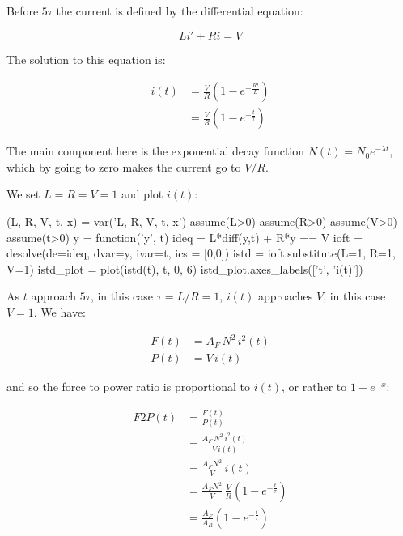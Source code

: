 \documentclass[]{../common/elementary-physics}
\begin{document}
Before $5 \tau$ the current is defined by the differential equation:

\begin{equation}
L i' + R i = V
\end{equation}

The solution to this equation is:

\begin{subequations}
\begin{align}
i(t) &= \frac{V}{R} (1 - e^{- \frac{R t}{L}}) \\
&= \frac{V}{R} (1 - e^{- \frac{t}{\tau}})
\end{align}
\end{subequations}

The main component here is the exponential decay function\cite{expdec} $N(t)=N_0e^{-\lambda t}$, which by going to zero 	makes the current go to $V/R$.

We set $L = R = V = 1$ and plot $i(t)$:

\begin{sagesilent}
(L, R, V, t, x) = var('L, R, V, t, x')
assume(L>0)
assume(R>0)
assume(V>0)
assume(t>0)
y = function('y', t)
ideq = L*diff(y,t) + R*y == V
ioft = desolve(de=ideq, dvar=y, ivar=t, ics = [0,0])
istd = ioft.substitute(L=1, R=1, V=1)
istd_plot = plot(istd(t), t, 0, 6)
istd_plot.axes_labels(['t', 'i(t)'])
\end{sagesilent}


As $t$ approach $5\tau$, in this case $\tau = L/R = 1$, $i(t)$ approaches $V$, in this case $V=1$.
We have:

\begin{subequations}
\begin{align}
F(t) &= A_F \, N^2 \, i^2(t) \\
P(t) &= V \, i(t)
\end{align}
\end{subequations}

and so the force to power ratio is proportional to $i(t)$, or rather to $1-e^{-x}$:

\begin{subequations}
\begin{align}
F2P(t) &= \frac{F(t)}{P(t)} \\
&= \frac{A_F \, N^2 \, i^2(t)}{V \, i(t)} \\
&= \frac{A_F N^2}{V} \, i(t) \\
&= \frac{A_F N^2}{V} \, \frac{V}{R} (1 - e^{- \frac{t}{\tau}}) \\
&= \frac{A_F}{A_R} (1 - e^{- \frac{t}{\tau}})
\end{align}
\end{subequations}
\end{document}
